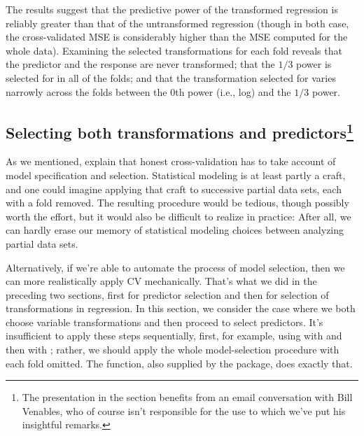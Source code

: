 \documentclass[
]{jss}
\begin{document}
The results suggest that the predictive power of the transformed
regression is reliably greater than that of the untransformed regression
(though in both case, the cross-validated MSE is considerably higher
than the MSE computed for the whole data). Examining the selected
transformations for each fold reveals that the predictor
 and the response  are never transformed;
that the \(1/3\) power is selected for  in all of the
folds; and that the transformation selected for  varies
narrowly across the folds between the \(0\)th power (i.e., log) and the
\(1/3\) power.

\hypertarget{selecting-both-transformations-and-predictorsvenables}{%
\subsection[Selecting both transformations and
predictors]{\texorpdfstring{Selecting both transformations and
predictors\footnote{The presentation in the section benefits from an
  email conversation with Bill Venables, who of course isn't responsible
  for the use to which we've put his insightful remarks.}}{Selecting both transformations and predictors}}\label{selecting-both-transformations-and-predictorsvenables}}

As we mentioned, \citet[Sec. 7.10.2: ``The Wrong and Right Way to Do
Cross-validation'']{HastieTibshiraniFriedman:2009} explain that honest
cross-validation has to take account of model specification and
selection. Statistical modeling is at least partly a craft, and one
could imagine applying that craft to successive partial data sets, each
with a fold removed. The resulting procedure would be tedious, though
possibly worth the effort, but it would also be difficult to realize in
practice: After all, we can hardly erase our memory of statistical
modeling choices between analyzing partial data sets.

Alternatively, if we're able to automate the process of model selection,
then we can more realistically apply CV mechanically. That's what we did
in the preceding two sections, first for predictor selection and then
for selection of transformations in regression. In this section, we
consider the case where we both choose variable transformations and then
proceed to select predictors. It's insufficient to apply these steps
sequentially, first, for example, using  with
 and then with ; rather, we
should apply the whole model-selection procedure with each fold omitted.
The  function, also supplied by the
 package, does exactly that.
\end{document}

